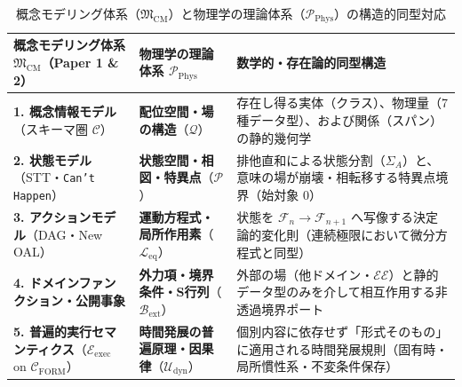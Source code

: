 \documentclass[11pt,a4paper]{ltjsarticle}
\theoremstyle{definition}
\theoremstyle{plain}
\theoremstyle{remark}
\newcommand{\Cform}{\mathcal{C}_{\mathrm{FORM}}}
\begin{document}
\begin{table}[htbp]
\centering
\caption{概念モデリング体系（$\mathfrak{M}_{\mathrm{CM}}$）と物理学の理論体系（$\mathcal{P}_{\mathrm{Phys}}$）の構造的同型対応}
\label{tab:phys-iso}
\small
\begin{tabular}{>{\raggedright\arraybackslash}p{4.3cm} >{\raggedright\arraybackslash}p{4.1cm} >{\raggedright\arraybackslash}p{6.0cm}}
\toprule
\textbf{概念モデリング体系 $\mathfrak{M}_{\mathrm{CM}}$（Paper 1 \& 2）} & \textbf{物理学の理論体系 $\mathcal{P}_{\mathrm{Phys}}$} & \textbf{数学的・存在論的同型構造} \\
\midrule
\textbf{1. 概念情報モデル}（スキーマ圏 $\mathcal{C}$） & \textbf{配位空間・場の構造}（$\mathcal{Q}$） & 存在し得る実体（クラス）、物理量（7種データ型）、および関係（スパン）の静的幾何学 \\
\addlinespace
\textbf{2. 状態モデル}（STT・\texttt{Can't Happen}） & \textbf{状態空間・相図・特異点}（$\mathcal{P}$） & 排他直和による状態分割（$\Sigma_A$）と、意味の場が崩壊・相転移する特異点境界（始対象 $0$） \\
\addlinespace
\textbf{3. アクションモデル}（DAG・New OAL） & \textbf{運動方程式・局所作用素}（$\mathcal{L}_{\mathrm{eq}}$） & 状態を $\mathcal{F}_n \to \mathcal{F}_{n+1}$ へ写像する決定論的変化則（連続極限において微分方程式と同型） \\
\addlinespace
\textbf{4. ドメインファンクション・公開事象} & \textbf{外力項・境界条件・S行列}（$\mathcal{B}_{\mathrm{ext}}$） & 外部の場（他ドメイン・$\mathcal{EE}$）と静的データ型のみを介して相互作用する非透過境界ポート \\
\addlinespace
\textbf{5. 普遍的実行セマンティクス}（$\mathcal{E}_{\mathrm{exec}}$ on $\Cform$） & \textbf{時間発展の普遍原理・因果律}（$\mathcal{U}_{\mathrm{dyn}}$） & 個別内容に依存せず「形式そのもの」に適用される時間発展規則（固有時・局所慣性系・不変条件保存） \\
\bottomrule
\end{tabular}
\end{table}
\end{document}
